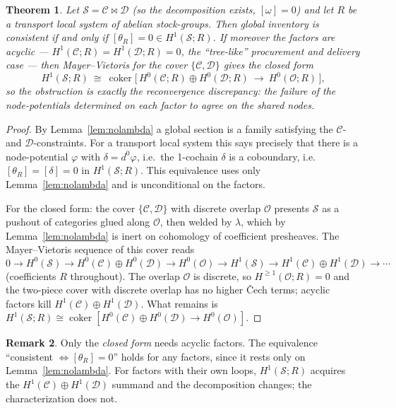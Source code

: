 \documentclass[11pt]{article}
\newtheorem{theorem}{Theorem}
\theoremstyle{definition}
\newtheorem{remark}[theorem]{Remark}
\newcommand{\Sc}{\mathcal{S}}
\newcommand{\C}{\mathcal{C}}
\newcommand{\D}{\mathcal{D}}
\newcommand{\Oc}{\mathcal{O}}
\newcommand{\bowtiemap}{\bowtie}
\begin{document}
\begin{theorem}\label{thm:degree1}
Let $\Sc=\C\bowtiemap\D$ (so the decomposition exists, $[\omega]=0$) and let $R$ be a transport
local system of abelian stock-groups. Then global inventory is consistent if and only if
$[\theta_R]=0\in H^1(\Sc;R)$. If moreover the factors are acyclic ---
$H^1(\C;R)=H^1(\D;R)=0$, the ``tree-like'' procurement and delivery case --- then
Mayer--Vietoris for the cover $\{\C,\D\}$ gives the closed form
\[
  H^1(\Sc;R)\ \cong\ \operatorname{coker}\!\bigl[\,H^0(\C;R)\oplus H^0(\D;R)\ \to\ H^0(\Oc;R)\,\bigr],
\]
so the obstruction is exactly the \emph{reconvergence discrepancy}: the failure of the
node-potentials determined on each factor to agree on the shared nodes.
\end{theorem}

\begin{proof}
By Lemma~\ref{lem:nolambda} a global section is a family satisfying the $\C$- and
$\D$-constraints. For a transport local system this says precisely that there is a
node-potential $\varphi$ with $\delta=d^0\varphi$, i.e.\ the 1-cochain $\delta$ is a coboundary,
i.e.\ $[\theta_R]=[\delta]=0$ in $H^1(\Sc;R)$. This equivalence uses only Lemma~\ref{lem:nolambda}
and is unconditional on the factors.

For the closed form: the cover $\{\C,\D\}$ with discrete overlap $\Oc$ presents $\Sc$ as a
pushout of categories glued along $\Oc$, then welded by $\lambda$, which by
Lemma~\ref{lem:nolambda} is inert on cohomology of coefficient presheaves. The Mayer--Vietoris
sequence of this cover reads
\[
  0\to H^0(\Sc)\to H^0(\C)\oplus H^0(\D)\to H^0(\Oc)\to H^1(\Sc)\to H^1(\C)\oplus H^1(\D)\to\cdots
\]
(coefficients $R$ throughout). The overlap $\Oc$ is discrete, so $H^{\geq1}(\Oc;R)=0$ and the
two-piece cover with discrete overlap has no higher \v{C}ech terms; acyclic factors kill
$H^1(\C)\oplus H^1(\D)$. What remains is
$H^1(\Sc;R)\cong\operatorname{coker}[H^0(\C)\oplus H^0(\D)\to H^0(\Oc)]$.
\end{proof}

\begin{remark}
Only the \emph{closed form} needs acyclic factors. The equivalence ``consistent $\iff
[\theta_R]=0$'' holds for any factors, since it rests only on Lemma~\ref{lem:nolambda}. For
factors with their own loops, $H^1(\Sc;R)$ acquires the $H^1(\C)\oplus H^1(\D)$ summand and the
decomposition changes; the characterization does not.
\end{remark}
\end{document}
